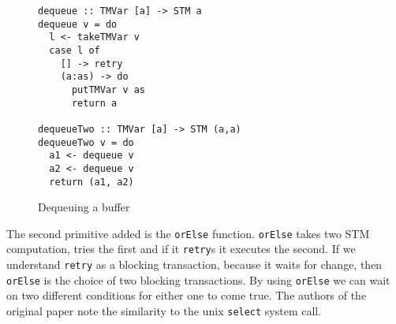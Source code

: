 \begin{figure}
  \begin{lstlisting}
dequeue :: TMVar [a] -> STM a
dequeue v = do
  l <- takeTMVar v
  case l of
    [] -> retry
    (a:as) -> do
      putTMVar v as
      return a

dequeueTwo :: TMVar [a] -> STM (a,a)
dequeueTwo v = do
  a1 <- dequeue v
  a2 <- dequeue v
  return (a1, a2)
  \end{lstlisting}
  \caption{Dequeuing a buffer}
  \label{fig:dequeue-two}
\end{figure}

The second primitive added is the \texttt{orElse} function. \texttt{orElse}
takes two STM computation, tries the first and if it \texttt{retry}s it
executes the second. If we understand \texttt{retry} as a blocking transaction,
because it waits for change, then \texttt{orElse} is the choice of two blocking
transactions. By using \texttt{orElse} we can wait on two different conditions
for either one to come true. The authors of the original paper note the
similarity to the unix \texttt{select} system call.